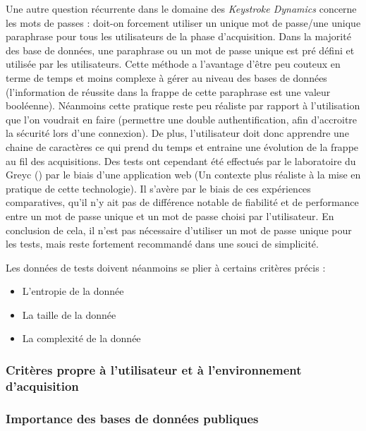 Une autre question récurrente dans le domaine des \textit{Keystroke Dynamics} concerne les mots de passes : doit-on forcement utiliser un unique mot de passe/une unique paraphrase pour tous les utilisateurs de la phase d'acquisition. Dans la majorité des base de données, une paraphrase ou un mot de passe unique est pré défini et utilisée par les utilisateurs. Cette méthode a l'avantage d'être peu couteux en terme de temps et moins complexe à gérer au niveau des bases de données (l'information de réussite dans la frappe de cette paraphrase est une valeur booléenne). Néanmoins cette pratique reste peu réaliste par rapport à l'utilisation que l'on voudrait en faire (permettre une double authentification, afin d'accroitre la sécurité lors d'une connexion). De plus, l'utilisateur doit donc apprendre une chaine de caractères ce qui prend du temps et entraine une évolution de la frappe au fil des acquisitions.
Des tests ont cependant été effectués par le laboratoire du Greyc (\cite{giotWeb}) par le biais d'une application web (Un contexte plus réaliste à la mise en pratique de cette technologie). Il s'avère par le biais de ces expériences comparatives, qu'il n'y ait pas de différence notable de fiabilité et de performance entre un mot de passe unique et un mot de passe choisi par l'utilisateur.
En conclusion de cela, il n'est pas nécessaire d'utiliser un mot de passe unique pour les tests, mais reste fortement recommandé dans une souci de simplicité.

Les données de tests doivent néanmoins se plier à certains critères précis :

\begin{itemize}
	\item L'entropie de la donnée
	\item La taille de la donnée
	\item La complexité de la donnée
\end{itemize}

\subsubsection{Critères propre à l'utilisateur et à l'environnement d'acquisition}



\subsubsection{Importance des bases de données publiques}
